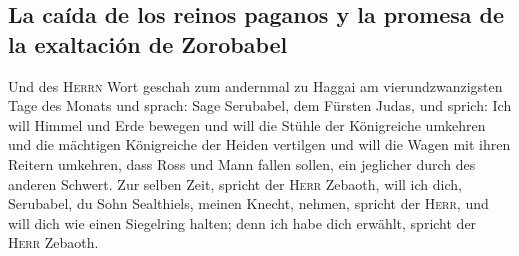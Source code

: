 \hypertarget{la-cauxedda-de-los-reinos-paganos-y-la-promesa-de-la-exaltaciuxf3n-de-zorobabel}{%
\subsection{La caída de los reinos paganos y la promesa de la exaltación
de
Zorobabel}\label{la-cauxedda-de-los-reinos-paganos-y-la-promesa-de-la-exaltaciuxf3n-de-zorobabel}}

 Und des \textsc{Herrn} Wort geschah zum andernmal zu
Haggai am vierundzwanzigsten Tage des Monats und sprach: 
Sage Serubabel, dem Fürsten Judas, und sprich: Ich will Himmel und Erde
bewegen  und will die Stühle der Königreiche umkehren und
die mächtigen Königreiche der Heiden vertilgen und will die Wagen mit
ihren Reitern umkehren, dass Ross und Mann fallen sollen, ein jeglicher
durch des anderen Schwert.  Zur selben Zeit, spricht der
\textsc{Herr} Zebaoth, will ich dich, Serubabel, du Sohn Sealthiels,
meinen Knecht, nehmen, spricht der \textsc{Herr}, und will dich wie
einen Siegelring halten; denn ich habe dich erwählt, spricht der
\textsc{Herr} Zebaoth.

